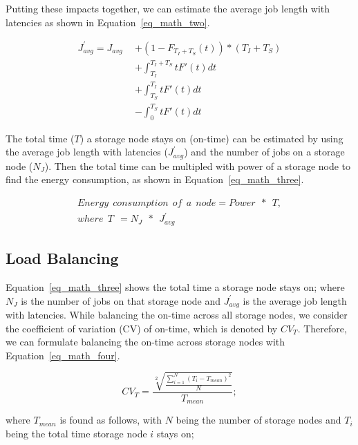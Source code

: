 Putting these impacts together, we can estimate the average
job length with latencies as 
shown in Equation~\eqref{eq_math_two}.

\begin{equation}
\label{eq_math_two}
\begin{aligned}
J_{avg}^{'} = J_{avg}\ \ &+ (1-F_{T_I+T_S}(t))*(T_I+T_S) \\
                       &+ \int_{T_I}^{T_I+T_S}tF'(t)dt \\
                       &+ \int_{T_S}^{T_I}tF'(t)dt \\
                       &- \int_{0}^{T_S}tF'(t)dt
\end{aligned}
\end{equation}
\hfill

The total time ($T$) a storage node stays on (on-time) can be estimated by using
the average job length with latencies ($J_{avg}^{'}$) and the number of jobs
on a storage node ($N_J$). Then the total time can be multipled with power
of a storage node to find the energy consumption, as shown in Equation~\eqref{eq_math_three}.

\begin{equation}
\begin{gathered}
Energy\ \ consumption\ \ of\ \ a\ \ node = Power\ \ *\ \ T,\\
where\ \ T\ \ = N_J\ \ *\ \ J_{avg}^{'}
\end{gathered}
\label{eq_math_three}
\end{equation}
\hfill

\subsection{Load Balancing}
Equation~\eqref{eq_math_three} shows the total time a storage node stays on;
where $N_J$ is the number of jobs on that storage node and $J_{avg}^{'}$
is the average job length with latencies. While balancing the on-time across
all storage nodes, we consider the coefficient of variation (CV) of on-time,
which is denoted by $CV_{T}$. Therefore, we can formulate balancing the
on-time across storage nodes with Equation~\eqref{eq_math_four}.

\begin{equation}
\label{eq_math_four}
CV_{T} = \frac{\sqrt[2]{\frac{\sum\limits_{i=1}^N (T_i - T_{mean}) ^ 2}{N}}}{T_{mean}};
\end{equation}
\hfill

where $T_{mean}$ is found as follows, with $N$ being the number of storage nodes
and $T_i$ being the total time storage node $i$ stays on;

